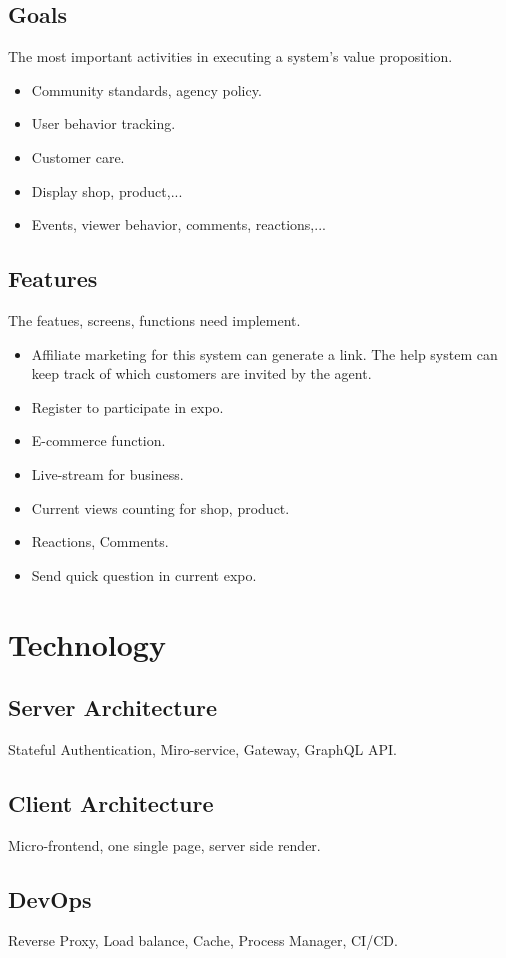 \documentclass{article}
\begin{document}
	\subsection{Goals}
	 The most important activities in executing a system's value proposition.
		\begin{itemize}
		\item Community standards, agency policy.
		\item User behavior tracking.
		\item Customer care.
		\item Display shop, product,...
		\item Events, viewer behavior, comments, reactions,...
	\end{itemize}
	\subsection{Features}
	The featues, screens, functions need implement.
	\begin{itemize}
		\item Affiliate marketing for this system can generate a link. The help system can keep track of which customers are invited by the agent.
		\item Register to participate in expo. 
		\item E-commerce function.
		\item Live-stream for business.
		\item Current views counting for shop, product.
		\item Reactions, Comments.
		\item Send quick question in current expo.
	\end{itemize}
	\section{Technology}
	\subsection{Server Architecture}
	Stateful Authentication, Miro-service, Gateway, GraphQL API.
	\subsection{Client Architecture}
	Micro-frontend, one single page, server side render.
	\subsection{DevOps}
	Reverse Proxy, Load balance, Cache, Process Manager, CI/CD.
	
\end{document}

